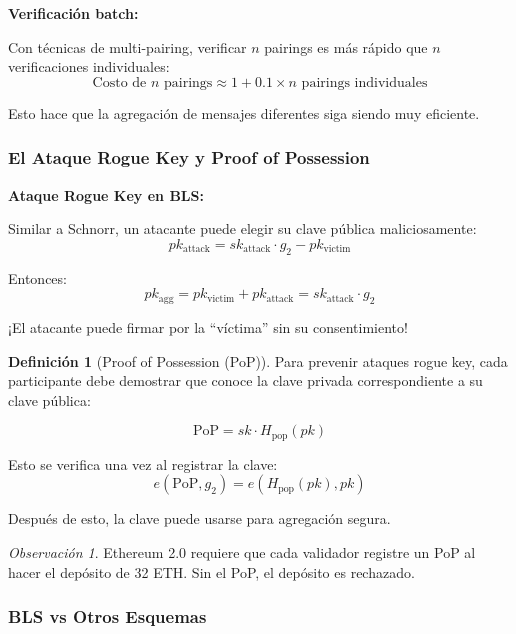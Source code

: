 \documentclass[11pt,a4paper,twoside,openright]{book}
\theoremstyle{definition}
\newtheorem{definition}{Definición}[chapter]
\theoremstyle{plain}
\theoremstyle{remark}
\newtheorem{remark}{Observación}[chapter]
\begin{document}
\begin{mathnote}
\textbf{Verificación batch:}

Con técnicas de multi-pairing, verificar $n$ pairings es más rápido que $n$ verificaciones individuales:
\[ \text{Costo de } n \text{ pairings} \approx 1 + 0.1 \times n \text{ pairings individuales} \]

Esto hace que la agregación de mensajes diferentes siga siendo muy eficiente.
\end{mathnote}

\subsubsection{El Ataque Rogue Key y Proof of Possession}

\begin{advertencia}
\textbf{Ataque Rogue Key en BLS:}

Similar a Schnorr, un atacante puede elegir su clave pública maliciosamente:
\[ pk_{\text{attack}} = sk_{\text{attack}} \cdot g_2 - pk_{\text{victim}} \]

Entonces:
\[ pk_{\text{agg}} = pk_{\text{victim}} + pk_{\text{attack}} = sk_{\text{attack}} \cdot g_2 \]

¡El atacante puede firmar por la ``víctima'' sin su consentimiento!
\end{advertencia}

\begin{definition}[Proof of Possession (PoP)]
Para prevenir ataques rogue key, cada participante debe demostrar que conoce la clave privada correspondiente a su clave pública:

\[ \text{PoP} = sk \cdot H_{\text{pop}}(pk) \]

Esto se verifica una vez al registrar la clave:
\[ e(\text{PoP}, g_2) = e(H_{\text{pop}}(pk), pk) \]

Después de esto, la clave puede usarse para agregación segura.
\end{definition}

\begin{remark}
Ethereum 2.0 requiere que cada validador registre un PoP al hacer el depósito de 32 ETH. Sin el PoP, el depósito es rechazado.
\end{remark}

\subsubsection{BLS vs Otros Esquemas}
\end{document}
